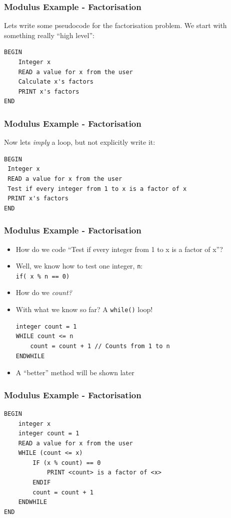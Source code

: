 \documentclass[14pt]{beamer}
\begin{document}
\begin{frame}[fragile]
\frametitle{Modulus Example - Factorisation}
Lets write some pseudocode for the factorisation problem. We start with something really ``high level'':
\begin{lstlisting}[style=pseudo]
BEGIN
	Integer x
	READ a value for x from the user
	Calculate x's factors
	PRINT x's factors
END
\end{lstlisting}
\end{frame}


\begin{frame}[fragile]
\frametitle{Modulus Example - Factorisation}
Now lets \textit{imply} a loop, but not explicitly write it:
\begin{lstlisting}[style=pseudo]
BEGIN
 Integer x
 READ a value for x from the user
 Test if every integer from 1 to x is a factor of x
 PRINT x's factors
END
\end{lstlisting}
\end{frame}

\begin{frame}[fragile]
\frametitle{Modulus Example - Factorisation}
\begin{itemize}
	\item How do we code ``Test if every integer from 1 to x is a factor of x''?
	\item Well, we know how to test one integer, \texttt{n}:\\ \texttt{if( x \% n == 0)}
	\item How do we \textit{count?}
	\item With what we know so far? A \texttt{while()} loop!

\begin{lstlisting}[style=pseudo]
integer count = 1
WHILE count <= n
	count = count + 1 // Counts from 1 to n
ENDWHILE
\end{lstlisting}
	\item A ``better'' method will be shown later
\end{itemize}
\end{frame}

\begin{frame}[fragile]
\frametitle{Modulus Example - Factorisation}
\begin{lstlisting}[style=pseudo]
BEGIN
	integer x
	integer count = 1
	READ a value for x from the user
	WHILE (count <= x)
 		IF (x % count) == 0
 			PRINT <count> is a factor of <x>
		ENDIF
		count = count + 1
	ENDWHILE
END
\end{lstlisting}
\end{frame}
\end{document}
